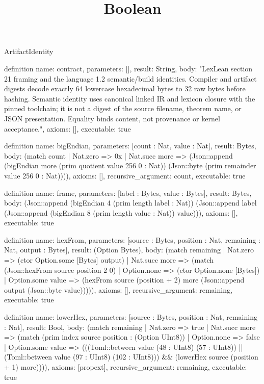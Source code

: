 \begin{lexlean}{ArtifactIdentity}
\title{Boolean}
\begin{semanticmodule}

definition{
 name: contract,
 parameters: [],
 result: String,
 body: "LexLean section 21 framing and the language 1.2 semantic/build identities. Compiler and artifact digests decode exactly 64 lowercase hexadecimal bytes to 32 raw bytes before hashing. Semantic identity uses canonical linked IR and lexicon closure with the pinned toolchain; it is not a digest of the source filename, theorem name, or JSON presentation. Equality binds content, not provenance or kernel acceptance.",
 axioms: [],
 executable: true
}

definition{
 name: bigEndian,
 parameters: [count : Nat, value : Nat],
 result: Bytes,
 body: (match count | Nat.zero => 0x | Nat.succ more => (Json::append (bigEndian more (prim quotient value 256 0 : Nat)) (Json::byte (prim remainder value 256 0 : Nat)))),
 axioms: [],
 recursive_argument: count,
 executable: true
}

definition{
 name: frame,
 parameters: [label : Bytes, value : Bytes],
 result: Bytes,
 body: (Json::append (bigEndian 4 (prim length label : Nat)) (Json::append label (Json::append (bigEndian 8 (prim length value : Nat)) value))),
 axioms: [],
 executable: true
}

definition{
 name: hexFrom,
 parameters: [source : Bytes, position : Nat, remaining : Nat, output : Bytes],
 result: (Option Bytes),
 body: (match remaining | Nat.zero => (ctor Option.some [Bytes] output) | Nat.succ more => (match (Json::hexFrom source position 2 0) | Option.none => (ctor Option.none [Bytes]) | Option.some value => (hexFrom source (position + 2) more (Json::append output (Json::byte value))))),
 axioms: [],
 recursive_argument: remaining,
 executable: true
}

definition{
 name: lowerHex,
 parameters: [source : Bytes, position : Nat, remaining : Nat],
 result: Bool,
 body: (match remaining | Nat.zero => true | Nat.succ more => (match (prim index source position : (Option UInt8)) | Option.none => false | Option.some value => (((Toml::between value (48 : UInt8) (57 : UInt8)) || (Toml::between value (97 : UInt8) (102 : UInt8))) && (lowerHex source (position + 1) more)))),
 axioms: [propext],
 recursive_argument: remaining,
 executable: true
}


\end{semanticmodule}
\end{lexlean}
